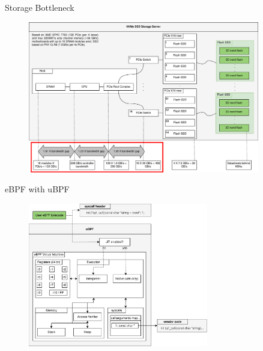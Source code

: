 \documentclass{beamer}
\begin{document}
% 
\begin{frame}{Storage Bottleneck}
	\begingroup
	\begin{figure}
		\centering
		\includegraphics[width=0.9\textwidth]{resources/images/storage-bottleneck.png}
	\end{figure}
	\endgroup
\end{frame}

% 
\begin{frame}{eBPF with uBPF}
	\begingroup
	\begin{figure}
		\centering
		\includegraphics[width=0.7\textwidth]{resources/images/ubpf-abi.pdf}
	\end{figure}
	\endgroup
\end{frame}
\end{document}

